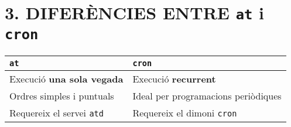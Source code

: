 \documentclass[
  12 pt,
  a4paper,
]{article}
\begin{document}
\section{\texorpdfstring{3. DIFERÈNCIES ENTRE \texttt{at} i
\texttt{cron}}{3. DIFERÈNCIES ENTRE at i cron}}\label{diferuxe8ncies-entre-at-i-cron}

\begin{longtable}[]{@{}ll@{}}
\toprule\noalign{}
\textbf{\texttt{at}} & \textbf{\texttt{cron}} \\
\midrule\noalign{}
\endhead
\bottomrule\noalign{}
\endlastfoot
Execució \textbf{una sola vegada} & Execució \textbf{recurrent} \\
Ordres simples i puntuals & Ideal per programacions periòdiques \\
Requereix el servei \texttt{atd} & Requereix el dimoni \texttt{cron} \\
\end{longtable}
\end{document}
